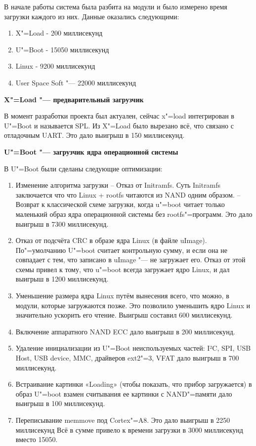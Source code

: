 \documentclass[10pt, a5paper]{article}
\begin{document}
В начале работы система была разбита на модули и было измерено время загрузки каждого из них. Данные оказались следующими:

\begin{enumerate}
  \item X"=Load	- 200 миллисекунд
  \item U"=Boot	- 15050 миллисекунд
  \item Linux	- 9200 миллисекунд
  \item User Space Soft "--- 22000 миллисекунд
\end{enumerate}

\textbf{X"=Load "--- предварительный загрузчик}

В момент разработки проекта был актуален, сейчас x"=load интегрирован в U"=Boot и называется SPL.
Из X"=Load было вырезано всё, что связано с отладочным UART. Это дало выигрыш в 150 миллисекунд.

\textbf{U"=Boot "--- загрузчик ядра операционной системы}

В U"=Boot были сделаны следующие оптимизации:

\begin{enumerate}
  \item Изменение алгоритма загрузки
  -- Отказ от Initramfs. Суть Initramfs заключается что что Linux + rootfs читаются из NAND одним образом.
  -- Возврат к классической схеме загрузки, когда u"=boot читает только маленький образ ядра операционной системы без rootfs"=программ.
  Это дало выигрыш в 7300 миллисекунд.
  \item Отказ от подсчёта CRC в образе ядра Linux (в файле uImage). По"=умолчанию U"=boot считает контрольную сумму, и если она не совпадает с тем, что записано в uImage "--- не загружает его. Отказ от этой схемы привел к тому, что u"=boot всегда загружает ядро Linux, и дал выигрыш в 1200 миллисекунд.
  \item Уменьшение размера ядра Linux путём вынесения всего, что можно, в модули, которые загружаются позже. Это позволило уменьшить ядро Linux и значительно ускорить его чтение. Выигрыш составил 600 миллисекунд.
  \item Включение аппаратного NAND ECC дало выигрыш в 200 миллисекунд.
  \item Удаление инициализации из U"=Boot неиспользуемых частей: I²C, SPI, USB Host, USB device, MMC, драйверов ext2"=3, VFAT дало выигрыш в 700 миллисекунд.
  \item Встраивание картинки «Loading» (чтобы показать, что прибор загружается) в образ U"=boot взамен считывания ее картинки с NAND"=памяти дало выигрыш в 100 миллисекунд.
  \item Переписывание memmove под Cortex"=A8. Это дало выигрыш в 2250 миллисекунд
Всё в сумме привело к времени загрузки в 3000 миллисекунд вместо 15050.
\end{enumerate}
\end{document}
